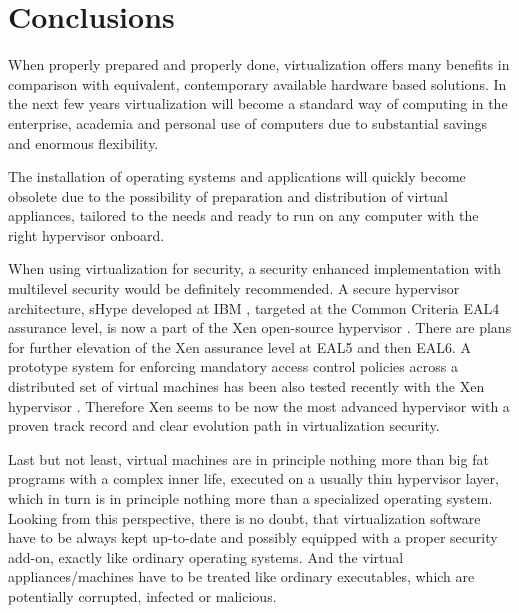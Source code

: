 \documentclass[11pt,a4paper]{llncs}
\begin{document}
\section{Conclusions}

When properly prepared and properly done, virtualization offers many
benefits in comparison with equivalent, contemporary available hardware 
based solutions. In the next few years virtualization will become a
standard way of computing in the enterprise, academia and personal use of
computers due to substantial savings and enormous flexibility.

The installation of operating systems and applications will quickly become
obsolete due to the possibility of preparation and distribution of virtual
appliances, tailored to the needs and ready to run on any computer with
the right hypervisor onboard. 

When using virtualization for security, a security enhanced implementation
with multilevel security \cite{MLS} would be definitely  recommended. 
A secure hypervisor architecture, sHype developed at IBM \cite{sHype}, 
targeted at the Common Criteria EAL4 assurance level, is now a part of the 
Xen open-source hypervisor \cite{XenMAC}. 
There are plans \cite{NRLVMM} for further elevation of the Xen assurance 
level at EAL5 and then EAL6. 
A prototype system for enforcing mandatory access control policies across 
a distributed set of virtual machines has been also tested recently with 
the Xen hypervisor \cite{Shamon}. 
Therefore Xen seems to be now the most advanced hypervisor with a proven
track record and clear evolution path in virtualization security. 

Last but not least, virtual machines are in principle nothing more than big 
fat programs with a complex inner life,  executed on a usually thin 
hypervisor layer, which in turn is in principle nothing more than a 
specialized operating system. Looking from this perspective, there is
no doubt, that virtualization software have to be always kept up-to-date 
and possibly equipped with a proper security add-on, exactly like ordinary 
operating systems. And the virtual appliances/machines have to be treated 
like ordinary executables, which are potentially corrupted, infected or 
malicious.
\end{document}
